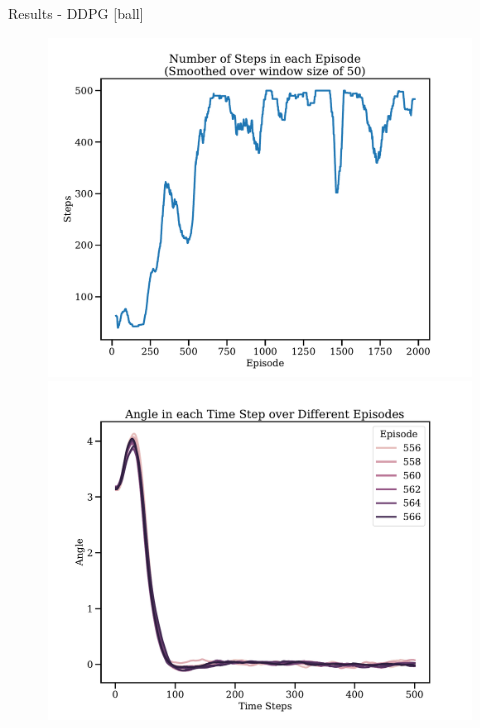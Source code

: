 \documentclass[10pt]{beamer}
\begin{document}
\begin{frame}[fragile]{Results - DDPG}
[ball]
\begin{figure}[!htb]
  \includegraphics[width=\linewidth]{../results/ddpg_res_episode_steps.pdf}
\endminipage\hfill
{}
  \includegraphics[width=\linewidth]{../results/ddpg_res_Angle.pdf}
\endminipage\hfill
{}

\end{figure}
\end{frame}
\end{document}
